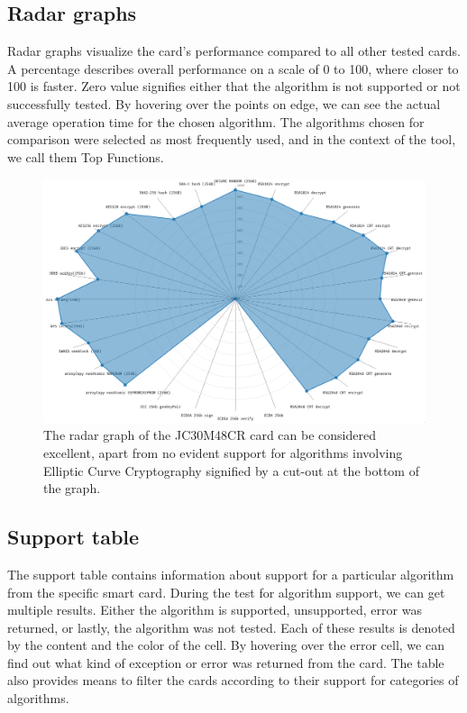 \subsection{Radar graphs}
Radar graphs visualize the card's performance compared to all other tested cards. A percentage describes overall performance on a scale of 0 to 100, where closer to 100 is faster. Zero value signifies either that the algorithm is not supported or not successfully tested. By hovering over the points on edge, we can see the actual average operation time for the chosen algorithm. The algorithms chosen for comparison were selected as most frequently used, and in the context of the tool, we call them Top Functions. 

\begin{figure}[h]
    \centering
    \includegraphics[width=\textwidth]{img/JC30M48CR radar graph.png}
    \caption{
    The radar graph of the JC30M48CR card  can be considered excellent, apart from no evident support for algorithms involving Elliptic Curve Cryptography signified by a cut-out at the bottom of the graph.
    }
    \label{fig:radar-graph}
\end{figure}

\subsection{Support table}
The support table contains information about support for a particular algorithm from the specific smart card. During the test for algorithm support, we can get multiple results. Either the algorithm is supported,  unsupported, error was returned, or lastly, the algorithm was not tested. Each of these results is denoted by the content and the color of the cell. By hovering over the error cell, we can find out what kind of exception or error was returned from the card. The table also provides means to filter the cards according to their support for categories of algorithms.

